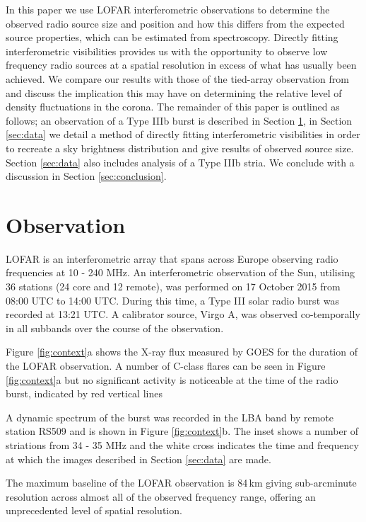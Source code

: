In this paper we use LOFAR interferometric observations to determine the observed radio source size and position and how this differs from the expected source properties, which can be estimated from spectroscopy. %
Directly fitting interferometric visibilities provides us with the opportunity to observe low frequency radio sources at a spatial resolution in excess of what has usually been achieved. We compare our results with those of the tied-array observation from \cite{Kontar2017} and discuss the implication this may have on determining the relative level of density fluctuations in the corona. 
The remainder of this paper is outlined as follows; an observation of a Type IIIb burst is described in Section \ref{sec:obs}, in Section \ref{sec:data} we detail a method of directly fitting interferometric visibilities in order to recreate a sky brightness distribution and give results of observed source size. Section \ref{sec:data} also includes analysis of a Type IIIb stria. We conclude with a discussion in Section \ref{sec:conclusion}.

\section{Observation} \label{sec:obs}
LOFAR is an interferometric array that spans across Europe observing radio frequencies at 10 - 240 MHz. 
An interferometric observation of the Sun, utilising 36 stations (24 core and 12 remote), was performed on 17 October 2015 from 08:00 UTC to 14:00 UTC. During this time, a Type III solar radio burst was recorded  at 13:21 UTC. A calibrator source, Virgo A, was observed co-temporally in all subbands over the course of the observation.

Figure \ref{fig:context}a shows the X-ray flux measured by GOES for the duration of the LOFAR observation. A number of C-class flares can be seen in Figure \ref{fig:context}a but no significant activity is noticeable at the time of the radio burst, indicated by red vertical lines

A dynamic spectrum of the burst was recorded in the LBA band by remote station RS509 and is shown in Figure \ref{fig:context}b. The inset shows a number of striations from 34 - 35 MHz and the white cross indicates the time and frequency at which the images described in Section \ref{sec:data} are made.

The maximum baseline of the LOFAR observation is 84\,km giving sub-arcminute resolution across almost all of the observed frequency range, offering an unprecedented level of spatial resolution.

